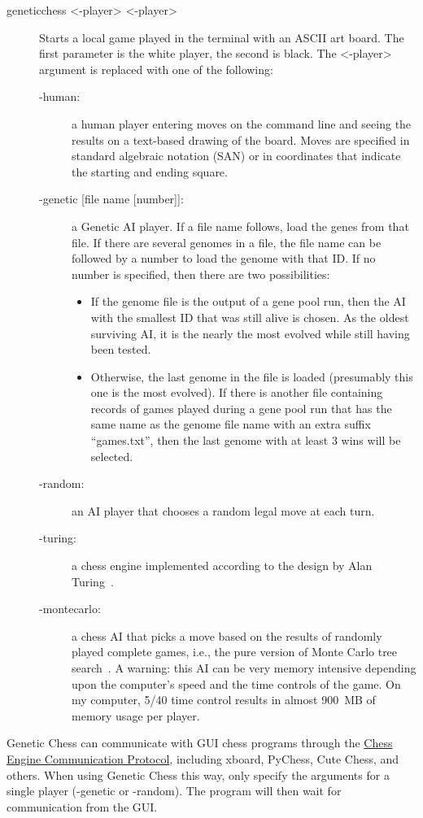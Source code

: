 \documentclass[letterpaper]{article}
\newcommand{\code}[1]{\small\textsf{#1}}
\renewcommand{\_}{\allowbreak\textunderscore\allowbreak}
\begin{document}
\begin{description}
	\item[\code{genetic\_chess <-player> <-player>}] Starts a local game played in the terminal with an ASCII art board. The first parameter is the white player, the second is black. The \code{<-player>} argument is replaced with one of the following:
	\begin{description}
		\item[\code{-human}:] a human player entering moves on the command line and seeing the results on a text-based drawing of the board. Moves are specified in standard algebraic notation (SAN) or in coordinates that indicate the starting and ending square.
		\item[\code{-genetic [file name [number]]}:] a Genetic AI player. If a file name follows, load the genes from that file. If there are several genomes in a file, the file name can be followed by a number to load the genome with that ID\@. If no number is specified, then there are two possibilities:
		\begin{itemize}
			\item If the genome file is the output of a gene pool run, then the AI with the smallest ID that was still alive is chosen. As the oldest surviving AI, it is the nearly the most evolved while still having been tested.
			\item Otherwise, the last genome in the file is loaded (presumably this one is the most evolved). If there is another file containing records of games played during a gene pool run that has the same name as the genome file name with an extra suffix ``\_games.txt'', then the last genome with at least 3 wins will be selected.
		\end{itemize}
		\item[\code{-random}:] an AI player that chooses a random legal move at each turn.
		\item[\code{-turing}:] a chess engine implemented according to the design by Alan Turing~\cite{turing-chess}.
		\item[\code{-montecarlo}:] a chess AI that picks a move based on the results of randomly played complete games, i.e., the pure version of Monte Carlo tree search~\cite{monte-carlo}. A warning: this AI can be very memory intensive depending upon the computer's speed and the time controls of the game. On my computer, 5/40 time control results in almost 900~MB of memory usage per player.
	\end{description}
\end{description}
Genetic Chess can communicate with GUI chess programs through the \href{https://www.gnu.org/software/xboard/engine-intf.html}{Chess Engine Communication Protocol}, including xboard, PyChess, Cute Chess, and others. When using Genetic Chess this way, only specify the arguments for a single player (\code{-genetic} or \code{-random}). The program will then wait for communication from the GUI\@.
\end{document}
